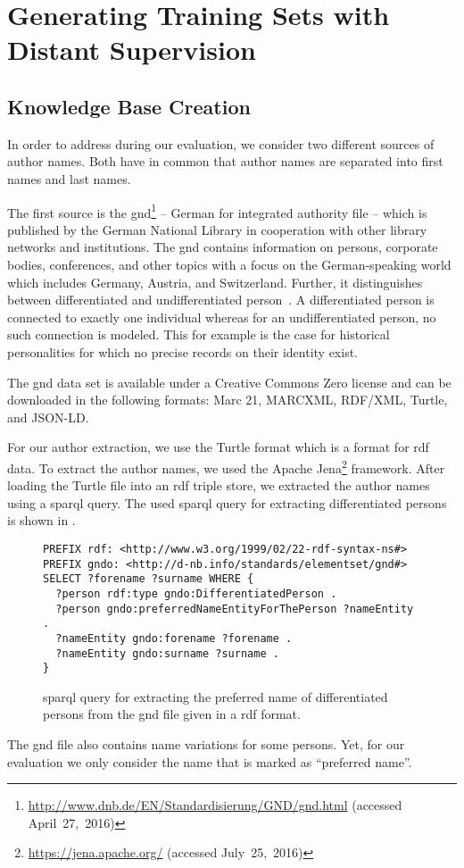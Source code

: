 \section{Generating Training Sets with Distant Supervision}\label{sec:i-distant-supervision}

\subsection{Knowledge Base Creation}\label{subsec:i-knowledge-base-creation}

In order to address  during our evaluation, we consider two different sources of author names.
Both have in common that author names are separated into first names and last names.

\bigskip

The first source is the \acrfull{gnd}\footnote{\url{http://www.dnb.de/EN/Standardisierung/GND/gnd.html} (accessed April~27,~2016)} -- German for integrated authority file --  which is published by the German National Library in cooperation with other library networks and institutions.
The \gls{gnd} contains information on persons, corporate bodies, conferences, and other topics with a focus on the German-speaking world which includes Germany, Austria, and Switzerland.
Further, it distinguishes between differentiated and undifferentiated person~\citep{hochstein2013ihr}.
A differentiated person is connected to exactly one individual whereas for an undifferentiated person, no such connection is modeled.
This for example is the case for historical personalities for which no precise records on their identity exist.

The \gls{gnd} data set is available under a Creative Commons Zero license and can be downloaded in the following formats: Marc 21, MARCXML, RDF/XML, Turtle, and JSON-LD.\@

For our author extraction, we use the Turtle format which is a format for \gls{rdf} data.
To extract the author names, we used the Apache Jena\footnote{\url{https://jena.apache.org/} (accessed July~25,~2016)} framework.
After loading the Turtle file into an \gls{rdf} triple store, we extracted the author names using a \gls{sparql} query.
The used \gls{sparql} query for extracting differentiated persons is shown in .
\begin{figure}[t]
\begin{lstlisting}[basicstyle=\ttfamily]
PREFIX rdf: <http://www.w3.org/1999/02/22-rdf-syntax-ns#>
PREFIX gndo: <http://d-nb.info/standards/elementset/gnd#>
SELECT ?forename ?surname WHERE {
  ?person rdf:type gndo:DifferentiatedPerson .
  ?person gndo:preferredNameEntityForThePerson ?nameEntity .
  ?nameEntity gndo:forename ?forename .
  ?nameEntity gndo:surname ?surname .
}
\end{lstlisting}
\caption{\gls{sparql} query for extracting the preferred name of differentiated persons from the \gls{gnd} file given in a \gls{rdf} format.}
\label{fig:gnd-sparql-query}
\end{figure}
The \gls{gnd} file also contains name variations for some persons.
Yet, for our evaluation we only consider the name that is marked as ``preferred name''.

